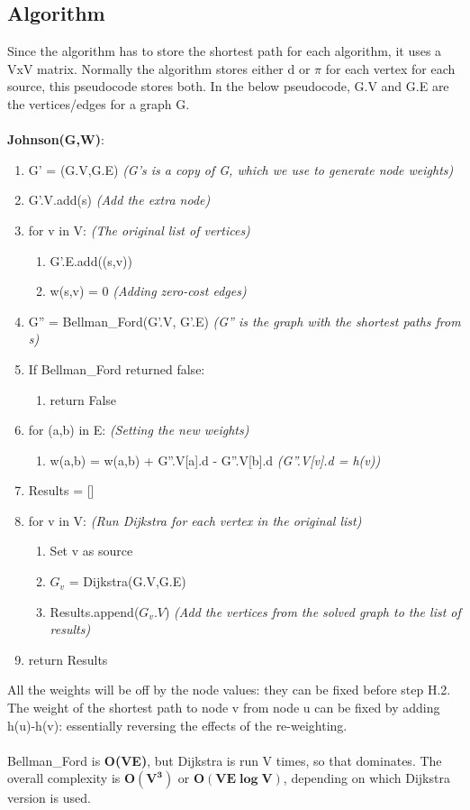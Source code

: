 \subsection{Algorithm}
Since the algorithm has to store the shortest path for each algorithm, it uses a VxV matrix. Normally the algorithm stores either d or $\pi$ for each vertex for each source, this pseudocode stores both. In the below pseudocode, G.V and G.E are the vertices/edges for a graph G.\\ \\
\textbf{Johnson(G,W)}:
\begin{enumerate}[label=\Alph*]
    \item G' = (G.V,G.E) \emph{(G's is a copy of G, which we use to generate node weights)}
    \item G'.V.add(s) \emph{(Add the extra node)}
    \item  for v in V: \emph{(The original list of vertices)}
\begin{enumerate}[label=\arabic*]
        \item G'.E.add((s,v))
        \item w(s,v) = 0  \emph{(Adding zero-cost edges)}
\end{enumerate}        
    \item G'' = Bellman\_Ford(G'.V, G'.E) \emph{(G'' is the graph with the shortest paths from s)}
    \item If Bellman\_Ford returned false:
    \begin{enumerate}
        \item [] return False
    \end{enumerate}    
    \item  for (a,b) in E: \emph{(Setting the new weights)}
    \begin{enumerate}
        \item [] w(a,b) = w(a,b) + G''.V[a].d -  G''.V[b].d  \quad \emph{(G''.V[v].d = h(v))}
    \end{enumerate}
    \item Results = []
    \item for v in V: \emph{(Run Dijkstra for each vertex in the original list)}
\begin{enumerate}[label=\arabic*]
    \item Set v as source
    \item $G_v$ = Dijkstra(G.V,G.E) 
    \item Results.append($G_v.V$) \emph{(Add the vertices from the solved graph to the list of results)}
\end{enumerate}    
    \item return Results
\end{enumerate}
All the weights will be off by the node values: they can be fixed before step H.2. The weight of the shortest path to node v from node u can be fixed by adding h(u)-h(v): essentially reversing the effects of the re-weighting. \\ \\
Bellman\_Ford is \textbf{O(VE)}, but Dijkstra is run V times, so that dominates. The overall complexity is $\boldsymbol{O(V^3)}$ or $\boldsymbol{O(VE\log V)}$, depending on which Dijkstra version is used. 

